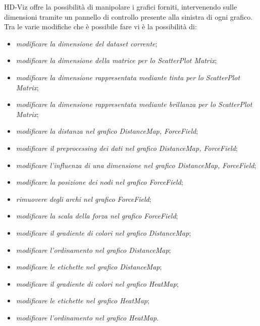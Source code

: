 \documentclass[../manuale_utente.tex]{subfiles}
\begin{document}
HD-Viz offre la possibilità di manipolare i grafici forniti, intervenendo sulle dimensioni tramite un pannello di controllo presente alla sinistra di ogni grafico. 
Tra le varie modifiche che è possibile fare vi è la possibilità di: 
\begin{itemize}
	\item \emph{modificare la dimensione del dataset corrente};
	\item \emph{modificare la dimensione della matrice per lo ScatterPlot Matrix};
	\item \emph{modificare la dimensione rappresentata mediante tinta per lo ScatterPlot Matrix};
	\item \emph{modificare la dimensione rappresentata mediante brillanza per lo ScatterPlot Matrix};
	\item \emph{modificare la distanza nel grafico DistanceMap, ForceField};
	\item \emph{modificare il preprocessing dei dati nel grafico DistanceMap, ForceField};
	\item \emph{modificare l’influenza di una dimensione nel grafico DistanceMap, ForceField};
	\item \emph{modificare la posizione dei nodi nel grafico ForceField};
	\item \emph{rimuovere degli archi nel grafico ForceField};
	\item \emph{modificare la scala della forza nel grafico ForceField};
	\item \emph{modificare il gradiente di colori nel grafico DistanceMap};
	\item \emph{modificare l’ordinamento nel grafico DistanceMap};
	\item \emph{modificare le etichette nel grafico DistanceMap};

	\item \emph{modificare il gradiente di colori nel grafico HeatMap};
	\item \emph{modificare le etichette nel grafico HeatMap};
	\item \emph{modificare l’ordinamento nel grafico HeatMap}.
\end{itemize}
\end{document}
